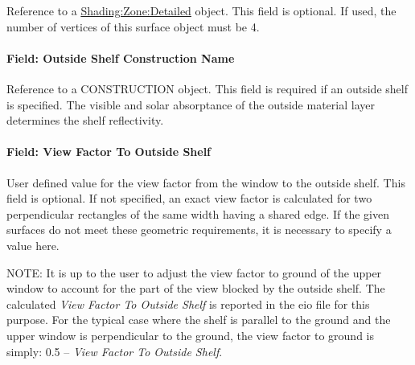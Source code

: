 Reference to a \hyperref[shadingzonedetailed-000]{Shading:Zone:Detailed} object. This field is optional. If used, the number of vertices of this surface object must be 4.

\paragraph{Field: Outside Shelf Construction Name}\label{field-outside-shelf-construction-name}

Reference to a CONSTRUCTION object. This field is required if an outside shelf is specified. The visible and solar absorptance of the outside material layer determines the shelf reflectivity.

\paragraph{Field: View Factor To Outside Shelf}\label{field-view-factor-to-outside-shelf}

User defined value for the view factor from the window to the outside shelf. This field is optional. If not specified, an exact view factor is calculated for two perpendicular rectangles of the same width having a shared edge. If the given surfaces do not meet these geometric requirements, it is necessary to specify a value here.

\begin{callout}
  NOTE: It is up to the user to adjust the view factor to ground of the upper window to account for the part of the view blocked by the outside shelf. The calculated \emph{View Factor To Outside Shelf} is reported in the eio file for this purpose. For the typical case where the shelf is parallel to the ground and the upper window is perpendicular to the ground, the view factor to ground is simply: 0.5 -- \emph{View Factor To Outside Shelf}.
\end{callout}

